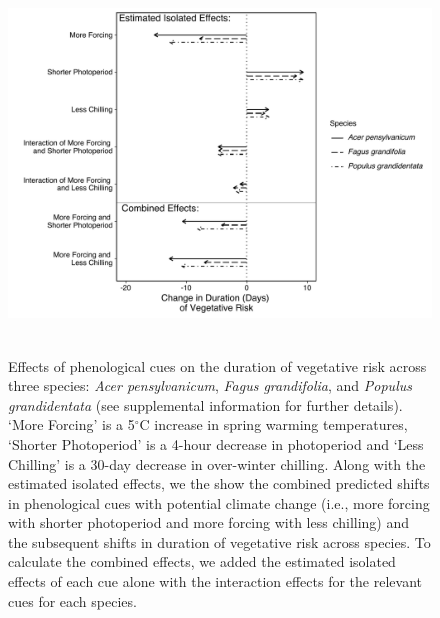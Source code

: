 \documentclass{article}\usepackage[]{graphicx}\usepackage[]{color}
\begin{document}
\begin{figure} [H] 
 \begin{center}
 \includegraphics[width=14cm, height=10cm]{..//figure/exp_intrxns_dvr.pdf} 
 \caption{Effects of phenological cues on the duration of vegetative risk across three species: \textit{Acer pensylvanicum}, \textit{Fagus grandifolia}, and \textit{Populus grandidentata} (see supplemental information for further details). `More Forcing' is a 5$^{\circ}$C increase in spring warming temperatures, `Shorter Photoperiod' is a 4-hour decrease in photoperiod and `Less Chilling' is a 30-day decrease in over-winter chilling. Along with the estimated isolated effects, we the show the combined predicted shifts in phenological cues with potential climate change (i.e., more forcing with shorter photoperiod and more forcing with less chilling) and the subsequent shifts in duration of vegetative risk across species. To calculate the combined effects, we added the estimated isolated effects of each cue alone with the interaction effects for the relevant cues for each species.}\label{fig:dan} 
 \end{center}
 \end{figure}
\end{document}
